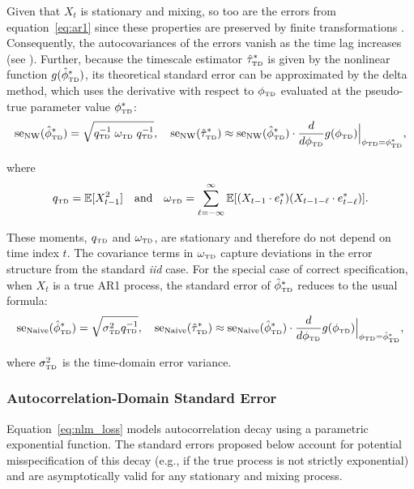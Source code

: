 \documentclass[docs/main.tex]{subfiles}
\begin{document}
Given that $X_t$ is stationary and mixing, so too are the errors from equation~\eqref{eq:ar1} since these properties are preserved by finite transformations \citep[Theorem~14.2 and Theorem~14.12]{hansen_econometrics_2022}. Consequently, the autocovariances of the errors vanish as the time lag increases (see ). Further, because the timescale estimator $\hat{\tau}^*_{\scriptscriptstyle\text{TD}}$ is given by the nonlinear function $g(\hat{\phi}^*_{\scriptscriptstyle\text{TD}})$, its theoretical standard error can be approximated by the delta method, which uses the derivative with respect to $\phi_{\scriptscriptstyle\text{TD}}$ evaluated at the pseudo-true parameter value $\phi_{\scriptscriptstyle\text{TD}}^*$:
\begin{align}
    \text{se}_{\text{NW}}(\hat{\phi}^*_{\scriptscriptstyle\text{TD}}) = \sqrt{q_{\scriptscriptstyle\text{TD}}^{-1}\; \omega_{\scriptscriptstyle\text{TD}} \; q_{\scriptscriptstyle\text{TD}}^{-1}} \label{eq:se-ar1-phi}, \quad
    \text{se}_{\text{NW}}(\hat{\tau}^*_{\scriptscriptstyle\text{TD}}) \approx \text{se}_{\text{NW}}(\hat{\phi}^*_{\scriptscriptstyle\text{TD}}) \cdot \frac{d}{d\phi_{\scriptscriptstyle\text{TD}}} g(\phi_{\scriptscriptstyle\text{TD}})\Big|_{\phi_{\scriptscriptstyle\text{TD}}=\phi_{\scriptscriptstyle\text{TD}}^*},
\end{align}

\noindent where
\begin{align}\label{eq:se-ar1-qomega}
    q_{\scriptscriptstyle\text{TD}} = \mathbb{E}[X_{t-1}^2] \quad\text{and}\quad \omega_{\scriptscriptstyle\text{TD}} = \sum_{\ell=-\infty}^{\infty} \mathbb{E}[(X_{t-1} \cdot e_t^*)(X_{t-1-\ell} \cdot e_{t-\ell}^*)].
\end{align}

\noindent These moments, $q_{\scriptscriptstyle\text{TD}}$ and $\omega_{\scriptscriptstyle\text{TD}}$, are stationary and therefore do not depend on time index $t$. The covariance terms in $\omega_{\scriptscriptstyle\text{TD}}$ capture deviations in the error structure from the standard \textit{iid} case. For the special case of correct specification, when $X_t$ is a true AR1 process, the standard error of $\hat{\phi}^*_{\scriptscriptstyle\text{TD}}$ reduces to the usual formula:
\begin{align}\label{eq:se-naive}
    \text{se}_{\text{Naive}}(\hat{\phi}^*_{\scriptscriptstyle\text{TD}}) = \sqrt{\sigma_{\scriptscriptstyle\text{TD}}^2 q_{\scriptscriptstyle\text{TD}}^{-1}}, \quad
    \text{se}_\text{Naive}(\hat{\tau}^*_{\scriptscriptstyle\text{TD}}) \approx \text{se}_{\text{Naive}}(\hat{\phi}^*_{\scriptscriptstyle\text{TD}}) \cdot \frac{d}{d\phi_{\scriptscriptstyle\text{TD}}} g(\phi_{\scriptscriptstyle\text{TD}})\Big|_{\phi_{\scriptscriptstyle\text{TD}}=\hat{\phi}^*_{\scriptscriptstyle\text{TD}}},
\end{align}

\noindent where $\sigma_{\scriptscriptstyle\text{TD}}^2$ is the time-domain error variance. \\

\subsubsection{Autocorrelation-Domain Standard Error}\label{sec:stderr-autocorrelation-domain}
Equation~\eqref{eq:nlm_loss} models autocorrelation decay using a parametric exponential function. The standard errors proposed below account for potential misspecification of this decay (e.g., if the true process is not strictly exponential) and are asymptotically valid for any stationary and mixing process.\\
\end{document}
